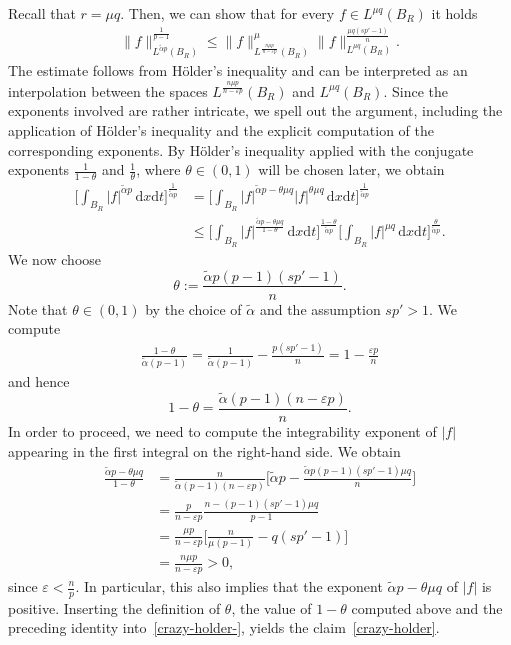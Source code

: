\documentclass[10pt,letterpaper]{amsart}
\theoremstyle{definition}
\numberwithin{theorem}{section}
\numberwithin{equation}{section}
\newcommand{\1}{\ensuremath{\mathds{1}}}
\newcommand{\dx}{\mathrm{d}x}
\newcommand{\dt}{\mathrm{d}t}
\renewcommand{\epsilon}{\varepsilon}
\renewcommand{\epsilon}{\varepsilon}
\numberwithin{equation}{section}
\begin{document}
Recall that $r=\mu q$. Then, we can show that for every $f\in L^{\mu q}(B_R)$ it holds
\begin{align}\label{crazy-holder}
    \|f\|_{L^{\tilde\alpha p}(B_R)}^{\frac{1}{p-1}}
    \le
    \|f\|_{L^{\frac{n\mu p}{\,n-\epsilon p\,}}(B_R)}^{\mu}
    \|f\|_{L^{\mu q}(B_R)}^{\frac{\mu q(sp'-1)}{n}} .
\end{align}
The estimate follows from Hölder's inequality and can be interpreted
as an interpolation between the spaces
$L^{\frac{n\mu p}{n-\epsilon p}}(B_R)$ and $L^{\mu q}(B_R)$. Since the exponents involved are rather intricate, we spell out the
argument, including the application of Hölder's inequality and the
explicit computation of the corresponding exponents. By Hölder's inequality applied with the conjugate exponents
\(\frac{1}{1-\theta}\) and \(\frac{1}{\theta}\), where \(\theta\in(0,1)\)
will be chosen later, we obtain
\begin{align}\label{crazy-holder-}\nonumber
    \bigg[\int_{B_R} |f|^{\tilde\alpha p} \,\dx\dt \bigg]^{\frac{1}{\tilde\alpha p}} 
    &=
    \bigg[\int_{B_R} |f|^{\tilde\alpha p-\theta\mu q}|f|^{\theta\mu q} \,\dx\dt \bigg]^{\frac{1}{\tilde\alpha p}} \\
    &\le 
    \bigg[\int_{B_R} |f|^{\frac{\tilde\alpha p-\theta\mu q}{1-\theta}} \,\dx\dt \bigg]^{\frac{1-\theta}{\tilde\alpha p}} 
    \bigg[\int_{B_R} |f|^{\mu q} \,\dx\dt \bigg]^{\frac{\theta}{\tilde\alpha p}}.
\end{align}
We now choose
$$
    \theta := \frac{\tilde \alpha p (p-1) (sp'-1)}{n}.
$$
Note that \(\theta\in(0,1)\) by the choice of $\tilde\alpha$ and the assumption $sp'>1$. We compute 
\begin{align*}
    \frac{1-\theta}{\tilde\alpha(p-1)}
    =
    \frac{1}{\tilde\alpha(p-1)} - \frac{p (sp'-1)}{n}
    =
    1-\frac{\epsilon p}{n}
\end{align*}
and hence 
\begin{equation*}
    1-\theta
    =
    \frac{\tilde\alpha(p-1)(n-\varepsilon p)}{n}.
\end{equation*}
In order to proceed, we need to compute the integrability exponent of $|f|$
appearing in the first integral on the right-hand side. We obtain
\begin{align*}
    \frac{\tilde\alpha p-\theta\mu q}{1-\theta}
    &=
    \frac{n}{\tilde\alpha(p-1)(n-\epsilon p)}
    \bigg[\tilde\alpha p-\frac{\tilde\alpha p(p-1)(sp'-1)\mu q}{n}\bigg] \\
    &=
    \frac{p}{n-\epsilon p}
    \frac{n-(p-1)(sp'-1)\mu q}{p-1} \\
    &=
    \frac{\mu p}{n-\epsilon p}
    \bigg[\frac{n}{\mu(p-1)}-q(sp'-1)\bigg] \\
    &=
    \frac{n\mu p}{n-\epsilon p}
    >
    0,
\end{align*}
since $\epsilon<\frac{n}{p}$. In particular, this also implies that the exponent $\tilde\alpha p-\theta\mu q$ of $|f|$ is positive. Inserting the definition of $\theta$, the value of $1-\theta$ computed above and the preceding identity into~\eqref{crazy-holder-}, yields the claim~\eqref{crazy-holder}. 
\end{document}
